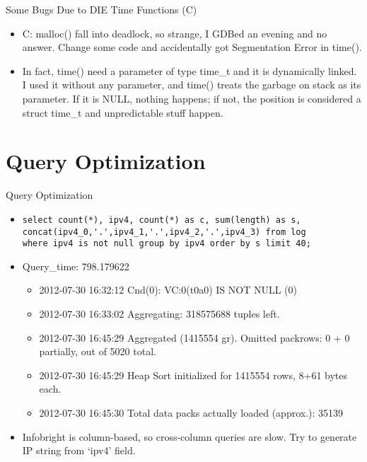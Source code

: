 \documentclass{beamer}
\begin{document}
\begin{frame}{Some Bugs Due to DIE Time Functions (C)}
\begin{itemize}
  \item C: malloc() fall into deadlock, so strange, I GDBed an evening and no answer. Change some code and accidentally got Segmentation Error in time().
  \item In fact, time() need a parameter of type time\_t and it is dynamically linked. I used it without any parameter, and time() treats the garbage on stack as its parameter. If it is NULL, nothing happens; if not, the position is considered a struct time\_t and unpredictable stuff happen.
\end{itemize}
\end{frame}

\section{Query Optimization}

\begin{frame}[fragile]{Query Optimization}
\begin{itemize}
  \item {\small
\begin{verbatim}
select count(*), ipv4, count(*) as c, sum(length) as s,
concat(ipv4_0,'.',ipv4_1,'.',ipv4_2,'.',ipv4_3) from log
where ipv4 is not null group by ipv4 order by s limit 40;
\end{verbatim}
}
  \item Query\_time: 798.179622
  \begin{itemize}
    \item 2012-07-30 16:32:12 Cnd(0):   VC:0(t0a0) IS NOT NULL       (0)
    \item 2012-07-30 16:33:02 Aggregating: 318575688 tuples left.
    \item 2012-07-30 16:45:29 Aggregated (1415554 gr). Omitted packrows: 0 + 0 partially, out of 5020 total.
    \item 2012-07-30 16:45:29 Heap Sort initialized for 1415554 rows, 8+61 bytes each.
    \item 2012-07-30 16:45:30 Total data packs actually loaded (approx.): 35139
  \end{itemize}
  \item Infobright is column-based, so cross-column queries are slow. Try to generate IP string from `ipv4' field.
\end{itemize}
\end{frame}
\end{document}
